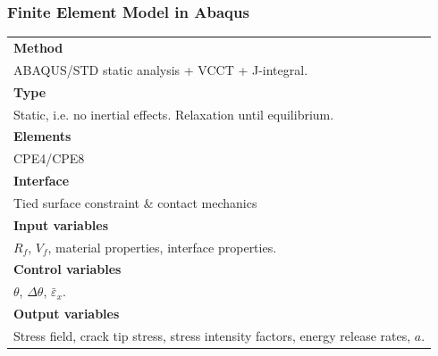\documentclass[first,firstsupp,lastsupp,handout,last,hyperref,table]{ETHclass}
\begin{document}
\begin{frame}
\frametitle{Finite Element Model in Abaqus}
\vspace{-0.7cm}
\centering
\captionsetup[figure]{font=scriptsize,labelfont=scriptsize}
\begin{table}[h!]
\scriptsize
  \centering
    \begin{tabularx}{\textwidth}{X}
    \toprule
    \midrule    
    \textbf{Method}\\
    ABAQUS/STD static analysis + VCCT + J-integral.\\
    \midrule
    \textbf{Type}\\
    Static, i.e. no inertial effects. Relaxation until equilibrium.\\
    \midrule
    \textbf{Elements}\\
    CPE4/CPE8\\
    \midrule
    \textbf{Interface}\\
    Tied surface constraint \& contact mechanics\\
    \midrule
   \textbf{Input variables}\\
    $R_{f}$, $V_{f}$, material properties, interface properties.\\
    \midrule
    \textbf{Control variables}\\
    $\theta$, $\Delta\theta$, $\bar{\varepsilon}_{x}$.\\
    \midrule
 \textbf{Output variables} \\
  Stress field, crack tip stress, stress intensity factors, energy release rates, $a$.\\
  \midrule
    \bottomrule
    \end{tabularx}%
  \label{tab:analysis_tab}%
\end{table}
\end{frame}
\end{document}
